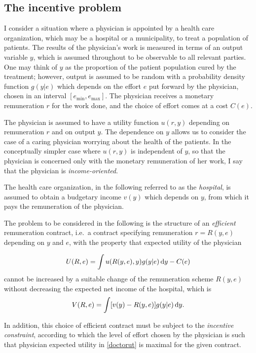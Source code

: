 \subsection{The incentive problem} %
\label{sub:the_incentive_problem}
I consider a situation where a physician is appointed by a health care organization, which may be a hospital or a municipality, to treat a population of patients. The results of the physician's work is measured in terms of an output variable $y$, which is assumed throughout to be observable to all relevant parties. One may think of $y$ as the proportion of the patient population cured by the treatment; however, output is assumed to be random with a probability density function $g(y|e)$ which depends on the effort $e$ put forward by the physician, chosen in an interval $\left[e_{\min},e_{\max}\right]$. The physician receives a monetary remuneration $r$ for the work done, and the choice of effort comes at a cost $C(e)$.

The physician is assumed to have a utility function $u(r,y)$ depending on remuneration $r$ and on output $y$. The dependence on $y$ allows us to consider the case of a caring physician worrying about the health of the patients. In the conceptually simpler case where $u(r,y)$ is independent of $y$, so that the physician is concerned only with the monetary remuneration of her work, I say that the physician is \emph{income-oriented}.

The health care organization, in the following referred to as the \emph{hospital}, is assumed to obtain a budgetary income $v(y)$ which depends on $y$, from which it pays the remuneration of the physician.

The problem to be considered in the following is the structure of an \emph{efficient} remuneration contract, i.e.\ a contract specifying remuneration $r=R(y,e)$ depending on $y$ and $e$, with the property that expected utility of the physician

\begin{align}
\label{doctorut}
    U(R,e)=\int u(R(y,e),y)g(y|e)\dif y-C(e)
\end{align}
cannot be increased by a suitable change of the remuneration scheme $R(y,e)$ without decreasing the expected net income of the hospital, which is
\[
    V(R,e)=\int [v(y)-R(y,e)]g(y|e)\dif y.
\]

In addition, this choice of efficient contract must be subject to the \emph{incentive constraint}, according to which the level of effort chosen by the physician is such that physician expected utility in \cref{doctorut} is maximal for the given contract.

